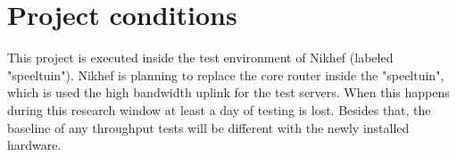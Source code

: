 \section{Project conditions}
This project is executed inside the test environment of Nikhef (labeled "speeltuin"). 
Nikhef is planning to replace the core router inside the "speeltuin", which is used the high bandwidth uplink for the test servers. 
When this happens during this research window at least a day of testing is lost. Besides that, the baseline of any throughput tests will be different with the newly installed hardware.   
